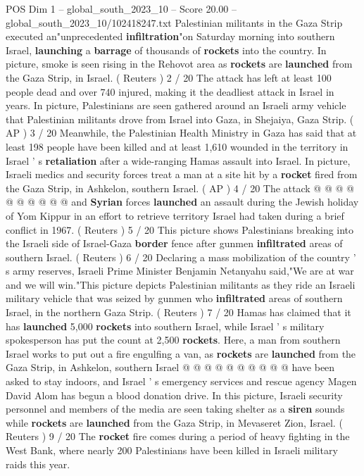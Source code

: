 \begin{textsample}{POS Dim 1 – global\_south\_2023\_10 – Score 20.00 – global\_south\_2023\_10/102418247.txt}  \label{ex:f1_pos_060}
Palestinian militants in the Gaza Strip executed an"unprecedented \textbf{infiltration}"on Saturday morning into southern Israel, \textbf{launching} a \textbf{barrage} of thousands of \textbf{rockets} into the country.
In picture, smoke is seen rising in the Rehovot area as \textbf{rockets} are \textbf{launched} from the Gaza Strip, in Israel. ( Reuters ) 2 / 20 The attack has left at least 100 people dead and over 740 injured, making it the deadliest attack in Israel in years.
In picture, Palestinians are seen gathered around an Israeli army vehicle that Palestinian militants drove from Israel into Gaza, in Shejaiya, Gaza Strip. ( AP ) 3 / 20 Meanwhile, the Palestinian Health Ministry in Gaza has said that at least 198 people have been killed and at least 1,610 wounded in the territory in Israel ' s \textbf{retaliation} after a wide-ranging Hamas assault into Israel.
In picture, Israeli medics and security forces treat a man at a site hit by a \textbf{rocket} fired from the Gaza Strip, in Ashkelon, southern Israel. ( AP ) 4 / 20 The attack @ @ @ @ @ @ @ @ @ @ and \textbf{Syrian} forces \textbf{launched} an assault during the Jewish holiday of Yom Kippur in an effort to retrieve territory Israel had taken during a brief conflict in 1967. ( Reuters ) 5 / 20 This picture shows Palestinians breaking into the Israeli side of Israel-Gaza \textbf{border} fence after gunmen \textbf{infiltrated} areas of southern Israel. ( Reuters ) 6 / 20 Declaring a mass mobilization of the country ' s army reserves, Israeli Prime Minister Benjamin Netanyahu said,"We are at war and we will win."This picture depicts Palestinian militants as they ride an Israeli military vehicle that was seized by gunmen who \textbf{infiltrated} areas of southern Israel, in the northern Gaza Strip. ( Reuters ) 7 / 20 Hamas has claimed that it has \textbf{launched} 5,000 \textbf{rockets} into southern Israel, while Israel ' s military spokesperson has put the count at 2,500 \textbf{rockets}.
Here, a man from southern Israel works to put out a fire engulfing a van, as \textbf{rockets} are \textbf{launched} from the Gaza Strip, in Ashkelon, southern Israel @ @ @ @ @ @ @ @ @ @ have been asked to stay indoors, and Israel ' s emergency services and rescue agency Magen David Alom has begun a blood donation drive.
In this picture, Israeli security personnel and members of the media are seen taking shelter as a \textbf{siren} sounds while \textbf{rockets} are \textbf{launched} from the Gaza Strip, in Mevaseret Zion, Israel. ( Reuters ) 9 / 20 The \textbf{rocket} fire comes during a period of heavy fighting in the West Bank, where nearly 200 Palestinians have been killed in Israeli military raids this year.

\end{textsample}
